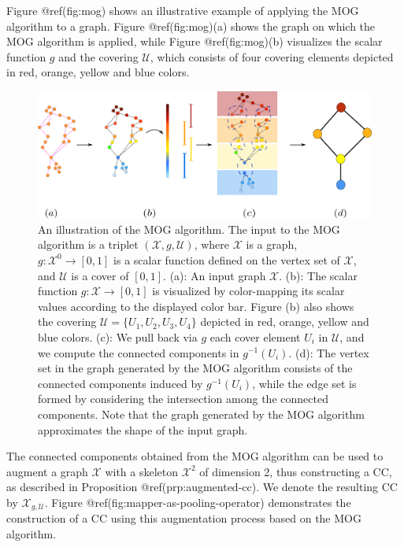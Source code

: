 \documentclass[
  12pt,
]{krantz}
\begin{document}
Figure @ref(fig:mog) shows an illustrative example of applying the MOG
algorithm to a graph. Figure @ref(fig:mog)(a) shows the graph on which
the MOG algorithm is applied, while Figure @ref(fig:mog)(b) visualizes
the scalar function \(g\) and the covering \(\mathcal{U}\), which
consists of four covering elements depicted in red, orange, yellow and
blue colors.

\begin{figure}

{\centering \includegraphics{figures/graph_tda_appendix} 

}

\caption{An illustration of the MOG algorithm. The input to the MOG algorithm is a triplet $(\mathcal{X}, g, \mathcal{U})$, where $\mathcal{X}$ is a graph, $g\colon\mathcal{X}^0\to [0,1]$ is a scalar function defined on the vertex set of $\mathcal{X}$, and  $\mathcal{U}$ is a cover of $[0,1]$. (a): An input graph $\mathcal{X}$. (b): The scalar function $g\colon\mathcal{X}\to [0,1]$ is visualized by color-mapping its scalar values according to the displayed color bar. Figure (b) also shows the covering $\mathcal{U}= \{U_1,U_2, U_3, U_4\}$ depicted in red, orange, yellow and blue colors. (c): We pull back via $g$ each cover element $U_i$ in $\mathcal{U}$, and we compute the connected components in $g^{-1}(U_i)$. (d): The vertex set in the graph generated by the MOG algorithm consists of the connected components induced by $g^{-1}(U_i)$, while the edge set is formed by considering the intersection among the connected components. Note that the graph generated by the MOG algorithm approximates the shape of the input graph.}\label{fig:mog}
\end{figure}

The connected components obtained from the MOG algorithm can be used to
augment a graph \(\mathcal{X}\) with a skeleton \(\mathcal{X}^2\) of
dimension 2, thus constructing a CC, as described in Proposition
@ref(prp:augmented-cc). We denote the resulting CC by
\(\mathcal{X}_{g,\mathcal{U}}\). Figure
@ref(fig:mapper-as-pooling-operator) demonstrates the construction of a
CC using this augmentation process based on the MOG algorithm.
\end{document}

